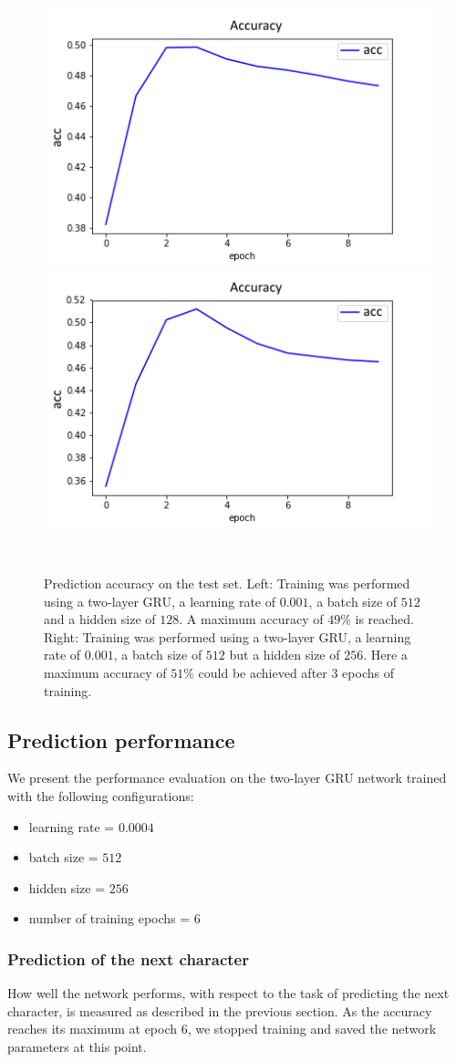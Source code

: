 \documentclass[11pt,a4paper,bibliography=totocnumbered,listof=totocnumbered]{scrartcl}
\begin{document}
\begin{figure}[!ht]
   \begin{minipage}{\textwidth}
     \centering
     \includegraphics[width=.4\textwidth]{acc_hs128}
     \includegraphics[width=.4\textwidth]{acc_hs256}
     \caption{Prediction accuracy on the test set. Left: Training was performed using a two-layer GRU, a learning rate of $0.001$, a batch size of $512$ and a hidden size of $128$. A maximum accuracy of $49\%$ is reached. Right: Training was performed using a two-layer GRU, a learning rate of $0.001$, a batch size of $512$ but a hidden size of $256$. Here a maximum accuracy of $51 \%$ could be achieved after 3 epochs of training.}
     \label{fig:sub1}
   \end{minipage}\\[1em]   
\end{figure}

\subsection{Prediction performance}
We present the performance evaluation on the two-layer GRU network trained with the following configurations:
\begin{itemize}
	\item learning rate = $0.0004$
	\item batch size = $512$
	\item hidden size = $256$
	\item number of training epochs = $6$
\end{itemize} 

\subsubsection{Prediction of the next character}
How well the network performs, with respect to the task of predicting the next character, is measured as described in the previous section. As the accuracy reaches its maximum at epoch 6, we stopped training and saved the network parameters at this point. 
\end{document}
